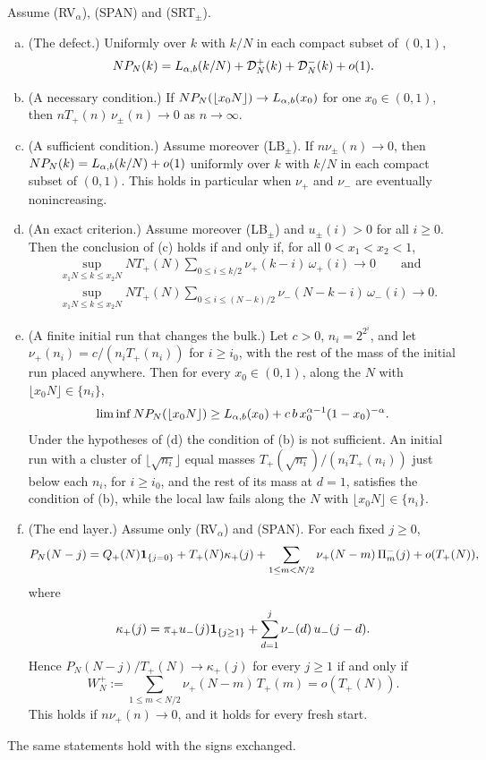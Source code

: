 \begin{introtheorem}\label{thm:initial}
Assume (RV$_\alpha$), (SPAN) and (SRT$_\pm$).
\begin{enumerate}[(a)]
\item (The defect.) Uniformly over $k$ with $k/N$ in each compact subset of $(0,1)$,
\[
 NP_N(k)=L_{\alpha,b}(k/N)+\mathcal D^{+}_N(k)+\mathcal D^{-}_N(k)+o(1).
\]
\item (A necessary condition.) If $NP_N(\lfloor x_0N\rfloor)\to L_{\alpha,b}(x_0)$ for one
$x_0\in(0,1)$, then $nT_\plus(n)\,\nu_\pm(n)\to0$ as $n\to\infty$.
\item (A sufficient condition.) Assume moreover (LB$_\pm$). If $n\nu_\pm(n)\to0$, then
$NP_N(k)=L_{\alpha,b}(k/N)+o(1)$ uniformly over $k$ with $k/N$ in each compact subset of
$(0,1)$. This holds in particular when $\nu_\plus$ and $\nu_\minus$ are eventually
nonincreasing.
\item (An exact criterion.) Assume moreover (LB$_\pm$) and $u_\pm(i)>0$ for all $i\ge0$.
Then the conclusion of (c) holds if and only if, for all $0<x_1<x_2<1$,
\begin{align*}
 &\sup_{x_1N\le k\le x_2N}NT_\plus(N)\sum_{0\le i\le k/2}\nu_\plus(k-i)\,\omega_\plus(i)\to0
 \qquad\text{and}\\
 &\sup_{x_1N\le k\le x_2N}NT_\plus(N)\sum_{0\le i\le(N-k)/2}\nu_\minus(N-k-i)\,\omega_\minus(i)\to0 .
\end{align*}
\item (A finite initial run that changes the bulk.) Let $c>0$, $n_i=2^{2^i}$, and let
$\nu_\plus(n_i)=c/(n_iT_\plus(n_i))$ for $i\ge i_0$, with the rest of the mass of the
initial run placed anywhere. Then for every $x_0\in(0,1)$, along the $N$ with
$\lfloor x_0N\rfloor\in\{n_i\}$,
\[
 \liminf NP_N(\lfloor x_0N\rfloor)\ge L_{\alpha,b}(x_0)+c\,b\,x_0^{\alpha-1}(1-x_0)^{-\alpha}.
\]
Under the hypotheses of (d) the condition of (b) is not sufficient. An initial run with
a cluster of $\lfloor\sqrt{n_i}\rfloor$ equal masses $T_\plus(\sqrt{n_i})/(n_iT_\plus(n_i))$
just below each $n_i$, for $i\ge i_0$, and the rest of its mass at $d=1$, satisfies the
condition of (b), while the local law fails along the
$N$ with $\lfloor x_0N\rfloor\in\{n_i\}$.
\item (The end layer.) Assume only (RV$_\alpha$) and (SPAN). For each fixed $j\ge0$,
\[
 P_N(N-j)=Q_{+}(N)\mathbf{1}_{\{j=0\}}+T_{+}(N)\kappa_{+}(j)
 +\sum_{1\le m<N/2}\nu_{+}(N-m)\,\Pi^{-}_m(j)+o(T_{+}(N)),
\]
where
\begin{equation}\label{eq:kappa-prep}
 \kappa_{+}(j)=\pi_{+} u_{-}(j)\mathbf{1}_{\{j\ge1\}}+\sum_{d=1}^{j}\nu_{-}(d)\,u_{-}(j-d).
\end{equation}
Hence $P_N(N-j)/T_\plus(N)\to\kappa_\plus(j)$ for every $j\ge1$ if and only if
\[
 W^\plus_N:=\sum_{1\le m<N/2}\nu_\plus(N-m)\,T_\plus(m)=o(T_\plus(N)).
\]
This holds if $n\nu_\plus(n)\to0$, and it holds for every fresh start.
\end{enumerate}
The same statements hold with the signs exchanged.
\end{introtheorem}

